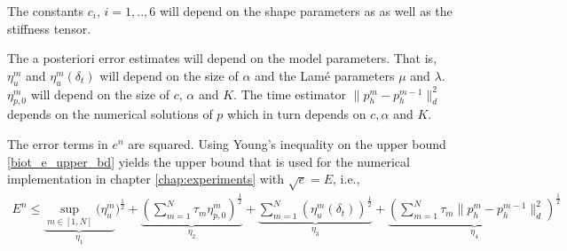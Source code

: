 \begin{remark}
The constants $c_i$, $i=1,..,6$ will depend on the shape parameters as as well as the stiffness tensor. 
\end{remark}
\begin{remark}
The a posteriori error estimates will depend on the model parameters. That is, $\eta^m_u$ and $\eta^m_u(\delta_t)$ will depend on the size of $\alpha$ and the Lamé parameters $\mu$ and $\lambda$.  $\eta^m_{p,0}$ will depend on the size of $c$, $\alpha$ and $K$. The time estimator $ \|p^m_{h} - p^{m-1}_{h}\|_d^2$ depends on the numerical solutions of $p$ which in turn depends on $c, \alpha$ and $K$.
\end{remark}
\begin{remark}
The error terms in $e^n$ are squared. Using Young's inequality on the upper bound \eqref{biot_e_upper_bd} yields the upper bound that is used for the numerical implementation in chapter \ref{chap:experiments} with $\sqrt{e}=E$, i.e.,
\begin{align*}
E^n \leq \underbrace{\sup_{m \in [1,N]} (\eta^m_u}_{\eta_1})^\frac{1}{2}  +  \underbrace{(\sum_{m=1}^N \tau_m \eta^m_{p,0})^\frac{1}{2}}_{\eta_2} + \underbrace{\sum_{m=1}^N (\eta^m_u(\delta_t))^\frac{1}{2}}_{\eta_3} + \underbrace{(\sum_{m=1}^N \tau_m \| p_h^m - p_h^{m-1}\|^2_d)^\frac{1}{2}}_{\eta_4}
\end{align*}
\end{remark}

